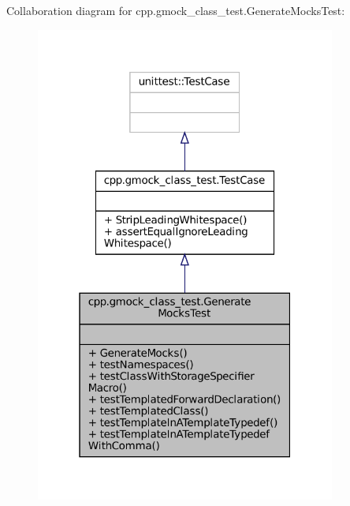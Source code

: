 Collaboration diagram for cpp.\+gmock\+\_\+class\+\_\+test.\+Generate\+Mocks\+Test\+:
\nopagebreak
\begin{figure}[H]
\begin{center}
\leavevmode
\includegraphics[width=280pt]{classcpp_1_1gmock__class__test_1_1GenerateMocksTest__coll__graph}
\end{center}
\end{figure}
